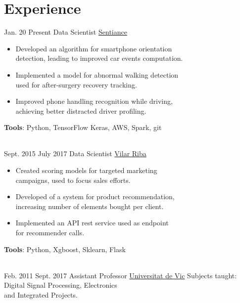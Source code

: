\documentclass[letterpaper]{DS_class_file} %
\begin{document}
    \makeprofile %



    \section{Experience}

    \begin{twenty}
        \twentyitem
        {Jan. 20}
        {Present}
        {Data Scientist}
        {\href{https://www.sentiance.com/}{Sentiance}}
        {}
        {\begin{itemize}
             \item Developed an algorithm for smartphone orientation\\detection, leading to improved car events computation.
             \item Implemented a model for abnormal walking detection\\used for after-surgery recovery tracking.
             \item Improved phone handling recognition while driving,\\achieving better distracted driver profiling.
        \end{itemize}
        \textbf{Tools}: Python, TensorFlow Keras, AWS, Spark, git}
        \\
        \twentyitem
        {Sept. 2015}
        {July 2017}
        {Data Scientist}
        {\href{http://www.vilarriba.com/}{Vilar Riba}}
        {}
        {\begin{itemize}
             \item Created scoring models for targeted marketing  \\ campaigns, used to focus sales efforts.
             \item Developed of a system for product recommendation, \\ increasing number of elements bought per client.
             \item Implemented an API rest service used as endpoint \\ for recommender calls.
        \end{itemize}
        \textbf{Tools}: Python, Xgboost, Sklearn, Flask }
        \\
        \twentyitem
        {Feb. 2011}
        {Sept. 2017}
        {Assistant Professor}
        {\href{https://www.uvic.cat/}{Universitat de Vic}}
        {Subjects taught: Digital Signal Processing, Electronics \\ and Integrated Projects.}
        {}
    \end{twenty}
\end{document}
